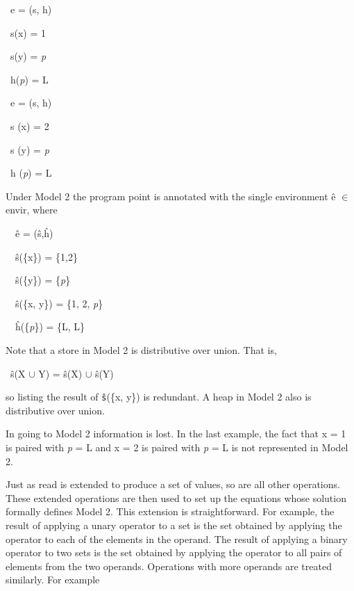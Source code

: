 {\ttfamily\mdseries
\ e = (s, h)}

{\ttfamily\mdseries
\ s(x) = 1}

{\ttfamily\mdseries
\ s(y) = \textit{p}\textit{}}

{\ttfamily\mdseries
\ h(\textit{p}\textit{}) = L}

{\ttfamily\mdseries
\ e = (s, h)}

{\ttfamily\mdseries
\ s (x) = 2}

{\ttfamily\mdseries
\ s (y) = \textit{p}\textit{}}

{\ttfamily\mdseries
\ h (\textit{p}\textit{}) = L}

Under Model 2 the program point is annotated with the single
environment \^e ${\in}$ envir\TextSubscript{[2]}, where

{\ttfamily\mdseries
\ \ \^e = (\^s,\^h)}

{\ttfamily\mdseries
\ \ \^s(\{x\}) = \{1,2\}}

{\ttfamily\mdseries
\ \ \^s(\{y\}) = \{\textit{p}\textit{}\}}

{\ttfamily\mdseries
\ \ \^s(\{x, y\}) = \{1, 2, \textit{p}\textit{}\}}

{\ttfamily\mdseries
\ \ \^h(\{\textit{p}\textit{}\}) = \{L, L\}}


Note that a store in Model 2 is distributive over union. That is, 

{\ttfamily\mdseries
\ \^s(X \textrm{${\cup}$} Y) = \^s(X) \textrm{${\cup}$} \^s(Y)}

\noindent so listing the result of \texttt{\^s}(\{x, y\}) is
redundant. A heap in Model 2 also is distributive over union.

In going to Model 2 information is lost. In the last example, the fact
that x = 1 is paired with \textit{p}\textit{} =
L and x = 2 is paired with
\textit{p}\textit{} = L is not
represented in Model 2.

Just as read is extended to produce a set of values, so are all other
operations. These {\textquotedbl}extended{\textquotedbl} operations
are then used to set up the equations whose solution formally defines
Model 2. This extension is straightforward. For example, the result of
applying a unary operator to a set is the set obtained by applying the
operator to each of the elements in the operand. The result of
applying a binary operator to two sets is the set obtained by applying
the operator to all pairs of elements from the two
operands. Operations with more operands are treated similarly. For
example

